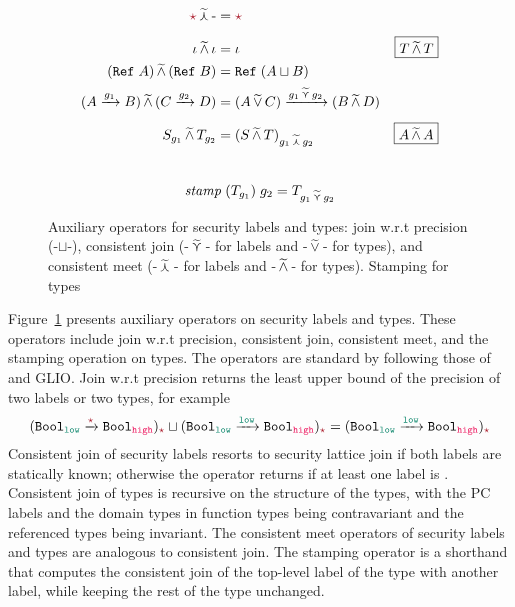\begin{figure}[tbp]
\begin{align*}
\unk \lconsismeet \text{-} &= \unk \\[1ex]
\iota \consismeet \iota &= \iota & \fbox{$T \consismeet T$} \\
(\Refer{A}) \consismeet (\Refer{B}) &= \Refer{(A \sqcup B)} \\
(\Fun{A}{g_1}{B}) \consismeet (\Fun{C}{g_2}{D}) &= \Fun{(A \consisjoin C)}{g_1 \lconsisjoin g_2}{(B \consismeet D)} \\[1ex]
S_{g_1} \consismeet T_{g_2} &= (S \consismeet T)_{g_1 \lconsismeet g_2}  & \fbox{$A \consismeet A$}
\end{align*}
\\[1ex]
\[
\mathit{stamp} \; (T_{g_1}) \; g_2 = T_{g_1 \,\widetilde{\curlyvee}\, g_2}
\]
\caption{Auxiliary operators for security labels and types: join w.r.t precision (-$\sqcup$-),
consistent join (-$\,\widetilde{\curlyvee}\,$- for labels and -$\,\widetilde{\vee}\,$- for types),
and consistent meet (-$\,\widetilde{\curlywedge}\,$- for labels and -$\,\widetilde{\wedge}\,$- for types).
Stamping for types}
\label{fig:grad-ops}
\end{figure}

Figure~\ref{fig:grad-ops} presents auxiliary operators on security labels and
types. These operators include join w.r.t precision, consistent join, consistent
meet, and the stamping operation on types. The operators are standard by following
those of \GSLRef and GLIO. Join w.r.t precision returns the least upper bound of
the precision of two labels or two types, for example
\[
(\Fun{\Bool_{\low}}{\unk}{\Bool_{\high}})_{\unk} \sqcup
(\Fun{\Bool_{\low}}{\low}{\Bool_{\high}})_{\unk} =
(\Fun{\Bool_{\low}}{\low}{\Bool_{\high}})_{\unk}
\]
Consistent join of security labels resorts to security lattice join if both
labels are statically known; otherwise the operator returns \unk if at least one
label is \unk. Consistent join of types is recursive on the structure of the
types, with the PC labels and the domain types in function types being
contravariant and the referenced types being invariant. The consistent meet
operators of security labels and types are analogous to consistent join. The
stamping operator is a shorthand that computes the consistent join of the
top-level label of the type with another label, while keeping the rest of the
type unchanged.

